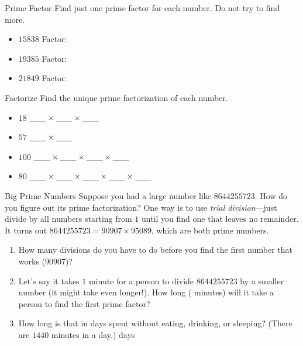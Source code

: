 \documentclass[12pt,letterpaper]{article}
\begin{document}
\begin{problem}{Prime Factor}
 Find just one prime factor for each number. Do not try to find more.

 \begin{itemize}
  \item $15838$ \hfill Factor: \underline{\hspace{2em}}
  \item $19385$ \hfill Factor: \underline{\hspace{2em}}
  \item $21849$ \hfill Factor: \underline{\hspace{2em}}
 \end{itemize}

\end{problem}


\begin{problem}{Factorize}
 Find the unique prime factorization of each number.

 \begin{itemize}
  \item $18$ \hfill $\underline{\hspace{2em}} \times \underline{\hspace{2em}} \times \underline{\hspace{2em}}$
  \item $57$ \hfill $\underline{\hspace{2em}} \times \underline{\hspace{2em}}$
  \item $100$ \hfill $\underline{\hspace{2em}} \times \underline{\hspace{2em}} \times \underline{\hspace{2em}} \times \underline{\hspace{2em}}$
  \item $80$ \hfill $\underline{\hspace{2em}} \times \underline{\hspace{2em}} \times \underline{\hspace{2em}} \times \underline{\hspace{2em}}
  \times \underline{\hspace{2em}}$
 \end{itemize}
\end{problem}

\begin{problem}{Big Prime Numbers}
 Suppose you had a large number like $8644255723$. How do you figure out its
 prime factorization? One way is to use \emph{trial division}---just divide by
 all numbers starting from $1$ until you find one that leaves no remainder. It
 turns out $8644255723 = 90907\times95089$, which are both prime numbers.

 \begin{enumerate}
  \item How many divisions do you have to do before you find the first number
  that works ($90907$)?
  \item Let's say it takes $1$ minute for a person to divide $8644255723$ by a
  smaller number (it might take even longer!). How long
  (\underline{\hspace{5em}} minutes) will it take a person to find the first
  prime factor?
  \item How long is that in days spent without eating, drinking, or sleeping?
  (There are $1440$ minutes in a day.) \hfill \underline{\hspace{2em}} days
 \end{enumerate}

\end{problem}
\end{document}
